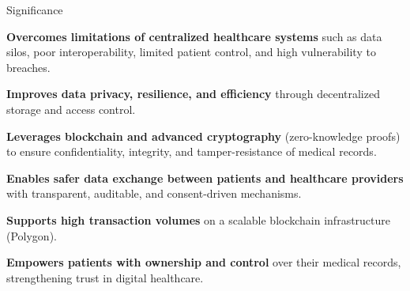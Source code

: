 \documentclass[10pt]{beamer}
\let\olditemize\itemize
\let\endolditemize\enditemize
\renewenvironment{itemize}
  {\olditemize\justifying}
  {\endolditemize}
\begin{document}
\begin{frame}{Significance}
\begin{itemize}
\item \textbf{Overcomes limitations of centralized healthcare systems} such as data silos, poor interoperability, limited patient control, and high vulnerability to breaches.
\item \textbf{Improves data privacy, resilience, and efficiency} through decentralized storage and access control.
\item \textbf{Leverages blockchain and advanced cryptography} (zero-knowledge proofs) to ensure confidentiality, integrity, and tamper-resistance of medical records.
\item \textbf{Enables safer data exchange between patients and healthcare providers} with transparent, auditable, and consent-driven mechanisms.
\item \textbf{Supports high transaction volumes} on a scalable blockchain infrastructure (Polygon).
\item \textbf{Empowers patients with ownership and control} over their medical records, strengthening trust in digital healthcare.
\end{itemize}
\end{frame}
\end{document}
